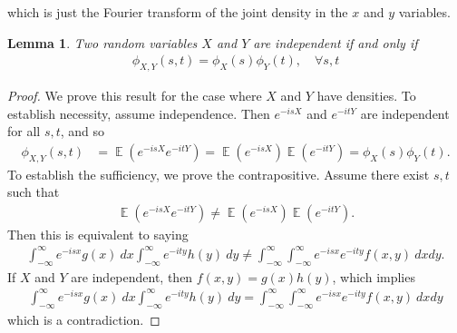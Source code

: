 \documentclass[12pt]{amsbook}
\DeclareMathOperator{\ex}{\mathbb{E}}
\theoremstyle{plain}
\newtheorem{lemma}[theorem]{Lemma}
\theoremstyle{definition}
\theoremstyle{remark}
\numberwithin{equation}{section}  %
\begin{document}
	which is just the Fourier transform of the joint density in the $x$ and $y$
	variables.
	\begin{lemma}\label{lem:char-ind}
		Two random variables $X$ and $Y$ are independent if and only if
		\begin{equation*}
			\begin{split}
				\phi_{X, Y}(s, t)= \phi_{X}(s) \phi_{Y}(t), \quad \forall s, t
			\end{split}
		\end{equation*}
	\end{lemma}
	\begin{proof}
		We prove this result for the case where $X$ and $Y$ have densities.
		To establish necessity, assume independence. Then
		$e^{-isX}$ and $e^{-itY}$ are independent for all $s, t$, and so
		\begin{equation*}
			\begin{split}
				\phi_{X,Y}(s,t) & = \ex(e^{-isX} e^{-itY}) = \ex(e^{-isX}) \ex(e^{-itY})
				= \phi_{X}(s) \phi_{Y}(t).
			\end{split}
		\end{equation*}
		To establish the sufficiency, we prove the contrapositive. Assume there exist $s, t$ such that
		\begin{equation*}
			\begin{split}
				\ex(e^{-isX} e^{-itY}) \neq \ex(e^{-isX}) \ex(e^{-itY}).
			\end{split}
		\end{equation*}
		Then this is equivalent to saying
		\begin{equation*}
			\begin{split}
				\int_{-\infty}^{\infty} e^{-isx} g(x) \ dx \int_{-\infty}^{\infty}
				e^{-ity} h(y) \ dy
				\neq 
				\int_{-\infty}^{\infty}\int_{-\infty}^{\infty} e^{-isx} e^{-ity} f(x, y) \ dx
				dy.
			\end{split}
		\end{equation*}
		If $X$ and $Y$ are independent, then $f(x, y) = g(x) h(y)$, which implies
		\begin{equation*}
			\begin{split}
				\int_{-\infty}^{\infty} e^{-isx} g(x) \ dx \int_{-\infty}^{\infty}
				e^{-ity} h(y) \ dy
				= 
				\int_{-\infty}^{\infty}\int_{-\infty}^{\infty} e^{-isx} e^{-ity} f(x, y) \ dx dy
			\end{split}
		\end{equation*}
		which is a contradiction.
	\end{proof}
\end{document}
